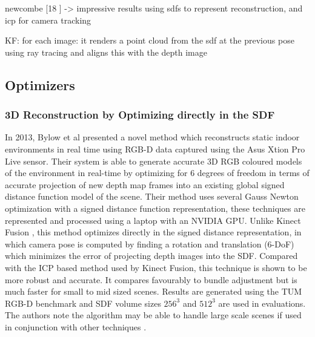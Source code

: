 newcombe [18 \cite{Newcombe11Kinectfusion} ] -> impressive results using sdfs to represent reconstruction, and icp for camera tracking

KF: for each image:
it renders a point cloud from the sdf at the previous pose using ray tracing and aligns this with the depth image



\subsection{Optimizers}

\subsubsection{3D Reconstruction by Optimizing directly in the SDF}

In 2013, Bylow et al \cite{Bylow13Real} presented a novel method which reconstructs static indoor environments in real time using RGB-D data captured using the Asus Xtion Pro Live sensor. Their system is able to generate accurate 3D RGB coloured models of the environment in real-time by optimizing for 6 degrees of freedom in terms of accurate projection of new depth map frames into an existing global signed distance function model of the scene. Their method uses several Gauss Newton optimization with a signed distance function representation, these techniques are represented and processed using a laptop with an NVIDIA GPU. Unlike Kinect Fusion \cite{Newcombe11Kinectfusion}, this method optimizes directly in the signed distance representation, in which camera pose is computed by finding a rotation and translation (6-DoF) which minimizes the error of projecting depth images into the SDF. Compared with the ICP based method used by Kinect Fusion, this technique is shown to be more robust and accurate. It compares favourably to bundle adjustment but is much faster for small to mid sized scenes. Results are generated using the TUM RGB-D benchmark and SDF volume sizes $256^3$ and $512^3$ are used in evaluations. The authors note the algorithm may be able to handle large scale scenes if used in conjunction with other techniques \cite{Kaess11Isam2,Kummerle11G}. \\

